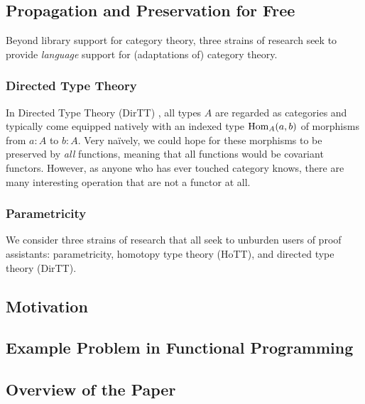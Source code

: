 \documentclass{lmcs} %
\theoremstyle{plain}\newtheorem{satz}[thm]{Satz} %
\theoremstyle{plain}
\theoremstyle{definition}
\begin{document}
\subsection{Propagation and Preservation for Free}
Beyond library support for category theory, three strains of research seek to provide \emph{language} support for (adaptations of) category theory.

\subsubsection{Directed Type Theory}
In Directed Type Theory (DirTT) \cite{2dtt,riehl-shulman-dtt,north-dirhott,dua-simplicial}, all types $A$ are regarded as categories and typically come equipped natively with an indexed type ${\mathrm{Hom}}_A(a, b)$ of morphisms from $a : A$ to $b : A$.
Very na\"ively, we could hope for these morphisms to be preserved by \emph{all} functions, meaning that all functions would be covariant functors.
However, as anyone who has ever touched category knows, there are many interesting operation that are not a functor at all.

\subsubsection{Parametricity}


We consider three strains of research that all seek to unburden users of proof assistants: parametricity, homotopy type theory (HoTT), and directed type theory (DirTT).




\subsection{Motivation}

\subsection{Example Problem in Functional Programming}

\subsection{Overview of the Paper}
\end{document}
